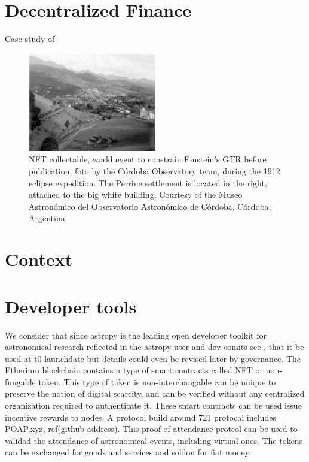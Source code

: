 \documentclass[final,5p,times,twocolumn,authoryear]{elsarticle}
\begin{document}
\section{Decentralized Finance} 

Case study of 
\begin{figure}[h!]
    \centering
    \label{fig:my_label}
  \caption{NFT collectable, world event to constrain Einstein's GTR before publication, foto by the C\'ordoba Observatory team,
during the 1912 eclipse expedition. The Perrine settlement is located in the right, attached to the big white building. Courtesy of the Museo Astron\'omico del Observatorio Astron\'omico de C\'ordoba, C\'ordoba, Argentina.}
  \includegraphics[width=0.5\textwidth]{figs/p1912.eps}
\end{figure}




\section{Context}
\label{section:context}
%


\section{Developer tools}
\label{section:Eth721}
%
We consider that since astropy is the leading open developer toolkit for astronomical research reflected in the astropy  user and dev comits see \cite{ 2020ASPC..522..491T}, that it be used at t0 launchdate but details could even be revised later by governance.  The Etherium blockchain contains a type of smart contracts called NFT or non-fungable token.  This type of token is non-interchangable can be unique to preserve the notion of digital scarcity, and can be verified without any centralized organization required to authenticate it. These smart contracts can be used issue incentive rewards to nodes. A protocol build around 721 protocal includes POAP.xyz, ref(github address). This proof of attendance protcol can be used to validad the attendance of astronomical events, including virtual ones. The tokens can be exchanged for goods and services and soldon for fiat money.  
\end{document}
